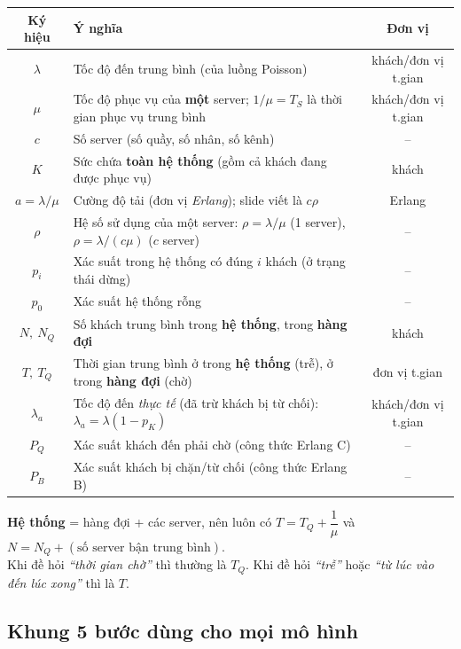 \begin{center}
\begin{tabularx}{\linewidth}{@{}c X c@{}}
\toprule
\textbf{Ký hiệu} & \textbf{Ý nghĩa} & \textbf{Đơn vị} \\
\midrule
$\lambda$ & Tốc độ đến trung bình (của luồng Poisson) & khách/đơn vị t.gian \\
$\mu$ & Tốc độ phục vụ của \textbf{một} server; $1/\mu = T_S$ là thời gian phục vụ trung bình & khách/đơn vị t.gian \\
$c$ & Số server (số quầy, số nhân, số kênh) & -- \\
$K$ & Sức chứa \textbf{toàn hệ thống} (gồm cả khách đang được phục vụ) & khách \\
$a = \lambda/\mu$ & Cường độ tải (đơn vị \emph{Erlang}); slide viết là $c\rho$ & Erlang \\
$\rho$ & Hệ số sử dụng của một server: $\rho=\lambda/\mu$ (1 server), $\rho = \lambda/(c\mu)$ ($c$ server) & -- \\
$p_i$ & Xác suất trong hệ thống có đúng $i$ khách (ở trạng thái dừng) & -- \\
$p_0$ & Xác suất hệ thống rỗng & -- \\
$N,\ N_Q$ & Số khách trung bình trong \textbf{hệ thống}, trong \textbf{hàng đợi} & khách \\
$T,\ T_Q$ & Thời gian trung bình ở trong \textbf{hệ thống} (trễ), ở trong \textbf{hàng đợi} (chờ) & đơn vị t.gian \\
$\lambda_a$ & Tốc độ đến \emph{thực tế} (đã trừ khách bị từ chối): $\lambda_a = \lambda(1-p_K)$ & khách/đơn vị t.gian \\
$P_Q$ & Xác suất khách đến phải chờ (công thức Erlang C) & -- \\
$P_B$ & Xác suất khách bị chặn/từ chối (công thức Erlang B) & -- \\
\bottomrule
\end{tabularx}
\end{center}

\begin{luuy}
\textbf{Hệ thống} = hàng đợi + các server, nên luôn có $T = T_Q + \dfrac{1}{\mu}$ và $N = N_Q + (\text{số server bận trung bình})$.\\
Khi đề hỏi \emph{“thời gian chờ”} thì thường là $T_Q$. Khi đề hỏi \emph{“trễ”} hoặc \emph{“từ lúc vào đến lúc xong”} thì là $T$.
\end{luuy}

\subsection{Khung 5 bước dùng cho mọi mô hình}\label{sec:khung}

